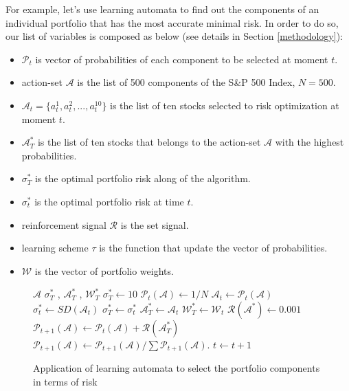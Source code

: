 For example, let's use learning automata to find out the components of an individual portfolio that has the most accurate minimal risk. In order to do so, our list of variables is composed as below (see details in Section \ref{methodology}):
\begin{itemize}
\item $\mathcal{P}_t$ is vector of probabilities of each component to be selected at moment $t$.
\item action-set $\mathcal{A}$ is the list of 500 components of the S\&P 500 Index, $N=500$.
\item $\mathcal{A}_t = \{a^1_t,a^2_t,...,a^{10}_t\}$ is the list of ten stocks selected to risk optimization at moment $t$.
\item $\mathcal{A}^*_T$ is the list of ten stocks that belongs to the action-set $\mathcal{A}$ with the highest probabilities.
\item $\sigma^*_T$ is the optimal portfolio risk along of the algorithm.
\item $\sigma^*_t$ is the optimal portfolio risk at time $t$.
\item reinforcement signal $\mathcal{R}$ is the set signal.
\item learning scheme $\tau$ is the function that update the vector of probabilities.
\item $\mathcal{W}$ is the vector of portfolio weights.
\end{itemize}

\begin{figure}[hbt]
\small
{}
\begin{algorithmic}[1]
\Require $\mathcal{A}$
\Ensure $\sigma^*_T$ , $\mathcal{A}^*_T$ , $\mathcal{W}^*_T $
 
	\State $\sigma^*_T \gets 10 $ 
    \State $\mathcal{P}_t(\mathcal{A})  \gets 1/N$
    \label{alg:while}
	\State $\mathcal{A}_t \gets \mathcal{P}_t(\mathcal{A})$
	\State $\sigma^*_t \gets SD(\mathcal{A}_t)$
	 \label{alg:receivedSignalV}%
		\State $\sigma^*_T\gets\sigma^*_t$
        \State $\mathcal{A}^*_T \gets \mathcal{A}_t$
        \State $\mathcal{W}^*_T \gets \mathcal{W}_t$
	\EndIf
	\State $\mathcal{R}(\mathcal{A}^*) \gets 0.001$ 
	\State $\mathcal{P}_{t+1}(\mathcal{A}) \gets \mathcal{P}_t(\mathcal{A}) + \mathcal{R}(\mathcal{A}^*_T)$ 
	\State $\mathcal{P}_{t+1}(\mathcal{A}) \gets \mathcal{P}_{t+1}(\mathcal{A})/ \sum \mathcal{P}_{t+1}(\mathcal{A}) $. 
    \State $t  \gets t+1$
  \EndWhile
\EndFor
\end{algorithmic}
\caption{Application of learning automata to select the portfolio components in terms of risk}
\label{alg: ls}
\end{figure}

